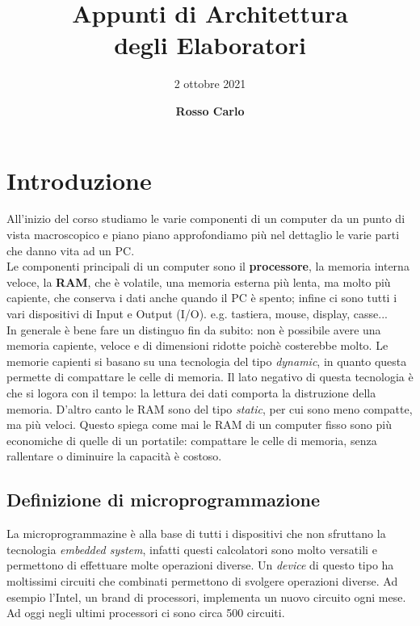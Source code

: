 \documentclass{article}
\title{\vspace{2cm}\textbf{Appunti di Architettura \\ degli Elaboratori}}
\author{\vspace{3mm}2 ottobre 2021}
\date{\vspace{3mm} \textbf{Rosso Carlo}}
\begin{document}
\begin{titlepage}
	\maketitle
	\thispagestyle{empty}
\end{titlepage}
\tableofcontents
\newpage

\section{Introduzione}

\newtheorem{definizione}{Definizione}[subsection]

All'inizio del corso studiamo le varie componenti di un computer da un punto di vista macroscopico e piano piano approfondiamo più nel dettaglio le varie parti che danno vita ad un PC.\\

Le componenti principali di un computer sono il \textbf{processore}, la memoria interna veloce, la \textbf{RAM}, che è volatile, una memoria esterna più lenta, ma molto più capiente, che conserva i dati anche quando il PC è spento; infine ci sono tutti i vari dispositivi di Input e Output (I/O). e.g. tastiera, mouse, display, casse...\\

In generale è bene fare un distinguo fin da subito: non è possibile avere una memoria capiente, veloce e di dimensioni ridotte poichè costerebbe molto. Le memorie capienti si basano su una tecnologia del tipo \textit{dynamic}, in quanto questa permette di compattare le celle di memoria. Il lato negativo di questa tecnologia è che si logora con il tempo: la lettura dei dati comporta la distruzione della memoria. D'altro canto le RAM sono del tipo \textit{static}, per cui sono meno compatte, ma più veloci. Questo spiega come mai le RAM di un computer fisso sono più economiche di quelle di un portatile: compattare le celle di memoria, senza rallentare o diminuire la capacità è costoso.

\subsection{Definizione di microprogrammazione}
	\label{microprogrammazione}
 La microprogrammazine è alla base di tutti i dispositivi che non sfruttano la tecnologia \textit{embedded system}, infatti questi calcolatori sono molto versatili e permettono di effettuare molte operazioni diverse. Un \textit{device} di questo tipo ha moltissimi circuiti che combinati permettono di svolgere operazioni diverse. Ad esempio l'Intel, un brand di processori, implementa un nuovo circuito ogni mese. Ad oggi negli ultimi processori ci sono circa 500 circuiti.\\
\end{document}
